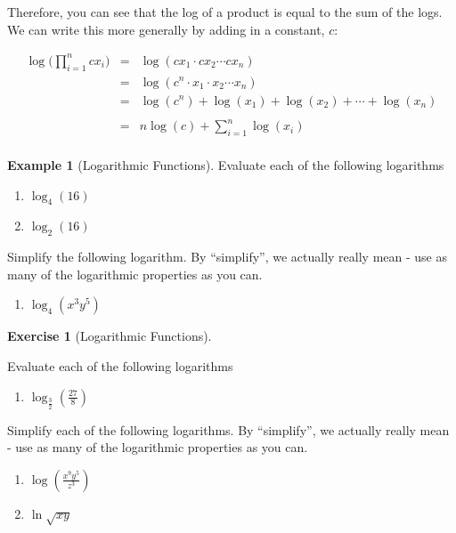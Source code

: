 \documentclass[
]{book}
\providecommand{\tightlist}{%
  \setlength{\itemsep}{0pt}\setlength{\parskip}{0pt}}
\theoremstyle{definition}
\theoremstyle{definition}
\newtheorem{example}{Example}[chapter]
\theoremstyle{definition}
\newtheorem{exercise}{Exercise}[chapter]
\theoremstyle{definition}
\theoremstyle{remark}
\begin{document}
Therefore, you can see that the log of a product is equal to the sum of the logs. We can write this more generally by adding in a constant, \(c\):

\begin{eqnarray*}
            \log \bigg(\prod\limits_{i=1}^n c x_i\bigg) &=& \log(cx_1 \cdot cx_2 \cdots cx_n)\\
            &=& \log(c^n \cdot x_1 \cdot x_2 \cdots x_n)\\
            &=& \log(c^n) + \log(x_1) + \log(x_2) + \cdots + \log(x_n)\\\\
            &=& n \log(c) +  \sum\limits_{i=1}^n \log (x_i)\\
\end{eqnarray*}

\begin{example}[Logarithmic Functions]
\protect\hypertarget{exm:log}{}{\label{exm:log} {} }
Evaluate each of the following logarithms

\begin{enumerate}
\def\labelenumi{\arabic{enumi}.}
\item
  \(\log_4(16)\)
\item
  \(\log_2(16)\)
\end{enumerate}

Simplify the following logarithm. By ``simplify'', we actually really mean - use as many of the logarithmic properties as you can.

\begin{enumerate}
\def\labelenumi{\arabic{enumi}.}
\setcounter{enumi}{2}
\tightlist
\item
  \(\log_4(x^3y^5)\)
\end{enumerate}
\end{example}

\begin{exercise}[Logarithmic Functions]
\protect\hypertarget{exr:log1}{}{\label{exr:log1} {} }

Evaluate each of the following logarithms

\begin{enumerate}
\def\labelenumi{\arabic{enumi}.}
\tightlist
\item
  \(\log_\frac{3}{2}(\frac{27}{8})\)
\end{enumerate}

Simplify each of the following logarithms. By ``simplify'', we actually really mean - use as many of the logarithmic properties as you can.

\begin{enumerate}
\def\labelenumi{\arabic{enumi}.}
\setcounter{enumi}{1}
\item
  \(\log(\frac{x^9y^5}{z^3})\)
\item
  \(\ln{\sqrt{xy}}\)
\end{enumerate}
\end{exercise}
\end{document}
